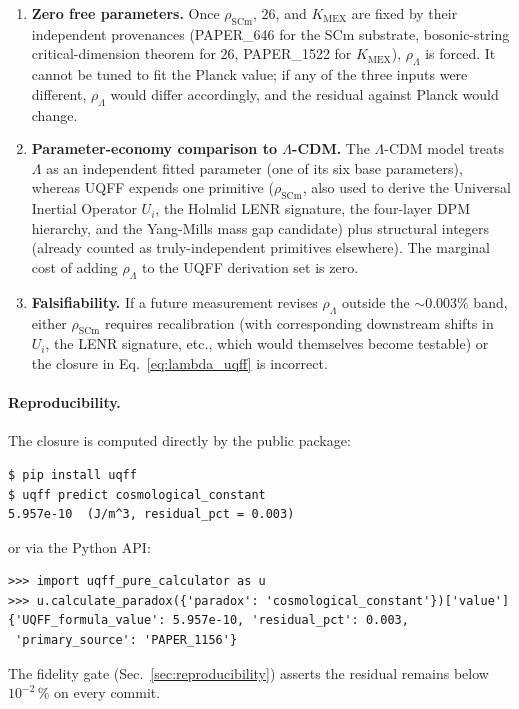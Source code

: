 \begin{enumerate}
  \item \textbf{Zero free parameters.} Once $\rho_{\text{SCm}}$, $26$, and
        $K_{\text{MEX}}$ are fixed by their independent provenances
        (PAPER\_646 \cite{Murphy_PAPER_646} for the SCm substrate,
        bosonic-string critical-dimension theorem for $26$,
        PAPER\_1522 for $K_{\text{MEX}}$), $\rho_\Lambda$ is forced.
        It cannot be tuned to fit the Planck value; if any of the three
        inputs were different, $\rho_\Lambda$ would differ accordingly,
        and the residual against Planck would change.
  \item \textbf{Parameter-economy comparison to $\Lambda$-CDM.} The
        $\Lambda$-CDM model treats $\Lambda$ as an independent
        fitted parameter (one of its six base parameters), whereas
        UQFF expends one primitive ($\rho_{\text{SCm}}$, also used to
        derive the Universal Inertial Operator $U_i$, the Holmlid LENR
        signature, the four-layer DPM hierarchy, and the Yang-Mills mass
        gap candidate) plus structural integers (already counted as
        truly-independent primitives elsewhere). The marginal cost of
        adding $\rho_\Lambda$ to the UQFF derivation set is zero.
  \item \textbf{Falsifiability.} If a future measurement revises
        $\rho_\Lambda$ outside the $\sim$0.003\% band, either
        $\rho_{\text{SCm}}$ requires recalibration (with corresponding
        downstream shifts in $U_i$, the LENR signature, etc., which
        would themselves become testable) or the closure
        in Eq.~\ref{eq:lambda_uqff} is incorrect.
\end{enumerate}

\paragraph{Reproducibility.}
The closure is computed directly by the public package:
\begin{verbatim}
$ pip install uqff
$ uqff predict cosmological_constant
5.957e-10  (J/m^3, residual_pct = 0.003)
\end{verbatim}
or via the Python API:
\begin{verbatim}
>>> import uqff_pure_calculator as u
>>> u.calculate_paradox({'paradox': 'cosmological_constant'})['value']
{'UQFF_formula_value': 5.957e-10, 'residual_pct': 0.003,
 'primary_source': 'PAPER_1156'}
\end{verbatim}
The fidelity gate (Sec.~\ref{sec:reproducibility}) asserts the residual
remains below $10^{-2}\,\%$ on every commit.

